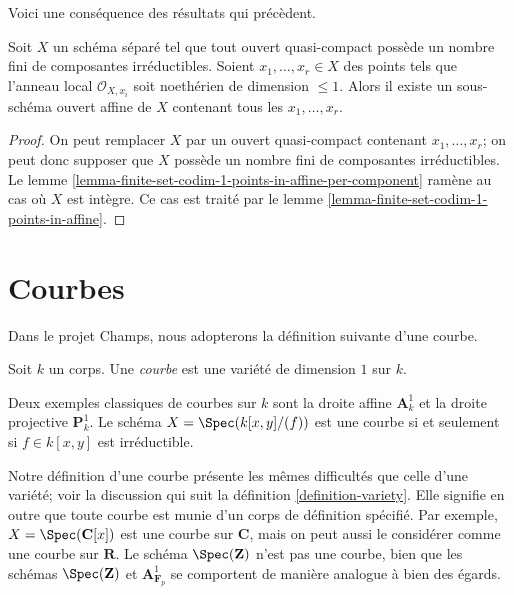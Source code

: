 \noindent
Voici une conséquence des résultats qui précèdent.

\begin{proposition}
\label{proposition-finite-set-of-points-of-codim-1-in-affine}
Soit $X$ un schéma séparé tel que tout ouvert quasi-compact
possède un nombre fini de composantes irréductibles. Soient $x_1, \ldots, x_r \in X$
des points tels que l'anneau local $\mathcal{O}_{X, x_i}$ soit noethérien
de dimension $\leq 1$. Alors il existe un sous-schéma ouvert affine
de $X$ contenant tous les $x_1, \ldots, x_r$.
\end{proposition}

\begin{proof}
On peut remplacer $X$ par un ouvert quasi-compact contenant $x_1, \ldots, x_r$;
on peut donc supposer que $X$ possède un nombre fini de composantes irréductibles.
Le lemme \ref{lemma-finite-set-codim-1-points-in-affine-per-component}
ramène au cas où $X$ est intègre. Ce cas est traité par le
lemme \ref{lemma-finite-set-codim-1-points-in-affine}.
\end{proof}





\section{Courbes}
\label{section-curves}

\noindent
Dans le projet Champs, nous adopterons la définition
suivante d'une courbe.

\begin{definition}
\label{definition-curve}
Soit $k$ un corps. Une {\it courbe} est une variété de dimension $1$ sur $k$.
\end{definition}

\noindent
Deux exemples classiques de courbes sur $k$ sont la droite affine $\mathbf{A}^1_k$
et la droite projective $\mathbf{P}^1_k$. Le schéma $X = \Spec(k[x, y]/(f))$
est une courbe si et seulement si $f \in k[x, y]$ est irréductible.

\medskip\noindent
Notre définition d'une courbe présente les mêmes difficultés que celle d'une
variété; voir la discussion qui suit la définition \ref{definition-variety}.
Elle signifie en outre que toute courbe est munie d'un corps de définition spécifié.
Par exemple, $X = \Spec(\mathbf{C}[x])$ est une courbe sur $\mathbf{C}$,
mais on peut aussi le considérer comme une courbe sur $\mathbf{R}$. Le schéma
$\Spec(\mathbf{Z})$ n'est pas une courbe, bien que les schémas $\Spec(\mathbf{Z})$
et $\mathbf{A}^1_{\mathbf{F}_p}$ se comportent de manière analogue à bien des égards.

